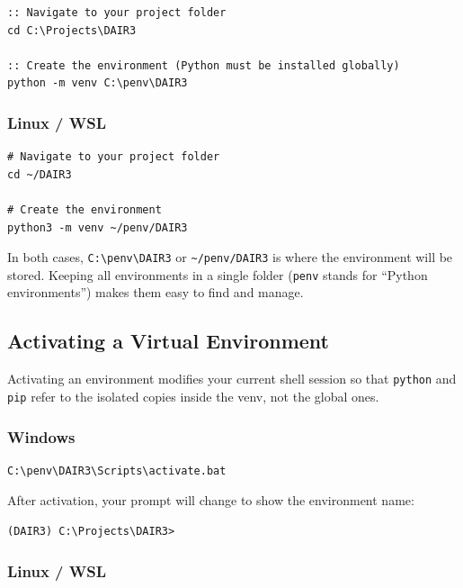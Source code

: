 \begin{lstlisting}[style=windowsStyle, caption={Creating a venv on Windows}]
:: Navigate to your project folder
cd C:\Projects\DAIR3

:: Create the environment (Python must be installed globally)
python -m venv C:\penv\DAIR3
\end{lstlisting}

\subsubsection{Linux / WSL}

\begin{lstlisting}[style=linuxStyle, caption={Creating a venv on Linux/WSL}]
# Navigate to your project folder
cd ~/DAIR3

# Create the environment
python3 -m venv ~/penv/DAIR3
\end{lstlisting}

In both cases, \texttt{C:\textbackslash penv\textbackslash DAIR3} or
\texttt{\textasciitilde/penv/DAIR3} is where the environment will be stored.
Keeping all environments in a single folder (\texttt{penv} stands for
``Python environments'') makes them easy to find and manage.

\subsection{Activating a Virtual Environment}

Activating an environment modifies your current shell session so that
\texttt{python} and \texttt{pip} refer to the isolated copies inside the
venv, not the global ones.

\subsubsection{Windows}

\begin{lstlisting}[style=windowsStyle, caption={Activating a venv on Windows}]
C:\penv\DAIR3\Scripts\activate.bat
\end{lstlisting}

After activation, your prompt will change to show the environment name:
\begin{lstlisting}[style=windowsStyle]
(DAIR3) C:\Projects\DAIR3>
\end{lstlisting}

\subsubsection{Linux / WSL}

